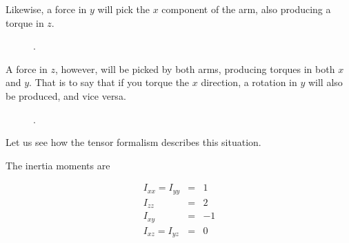 Likewise, a force in $y$ will pick the $x$ component of the arm, also producing a torque in $z$. 

\begin{figure}
  \begin{center}
  \end{center}
  \caption[]{.}
  \label{fig:tensor17}
\end{figure}

A force in $z$, however, will be picked by both arms, producing torques in both $x$ and $y$. That is to say that if you torque the $x$ direction, a rotation in $y$ will also be produced, and vice versa. 


\begin{figure}
  \begin{center}
  \end{center}
  \caption[]{.}
  \label{fig:tensor18}
\end{figure}


Let us see how the tensor formalism describes this situation.

The inertia moments are

\begin{eqnarray}
I_{xx} = I_{yy} &=& 1\\
I_{zz} &=& 2\\
I_{xy} &=& -1 \\
I_{xz} = I_{yz} &=& 0 
\end{eqnarray}


